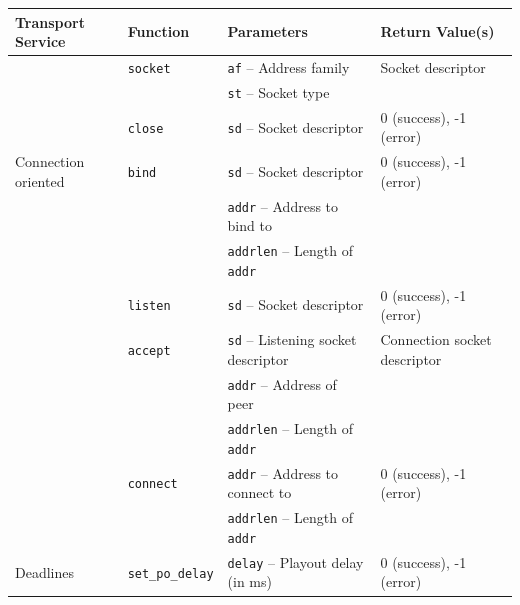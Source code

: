 \documentclass[10pt]{sig-alternate-05-2015}
\begin{document}
\begin{table}
  \small
  \centering
  \begin{tabularx}{\textwidth}{llll}
    \toprule
      Transport Service            & Function & Parameters                                     & Return Value(s) \\
    \midrule
                                   & \texttt{socket}
                                              & \texttt{af} -- Address family                  & Socket descriptor \\
                                   &          & \texttt{st} -- Socket type & \\
                                   & \texttt{close}
                                              & \texttt{sd} -- Socket descriptor               & 0 (success), -1 (error) \\
    \midrule
      Connection oriented          & \texttt{bind}
                                              & \texttt{sd} -- Socket descriptor               & 0 (success), -1 (error) \\
                                   &          & \texttt{addr} -- Address to bind to & \\
                                   &          & \texttt{addrlen} -- Length of \texttt{addr} & \\
                                   & \texttt{listen}
                                              & \texttt{sd} -- Socket descriptor               & 0 (success), -1 (error) \\
                                   & \texttt{accept}
                                              & \texttt{sd} -- Listening socket descriptor     & Connection socket descriptor \\
                                   &          & \texttt{addr} -- Address of peer & \\
                                   &          & \texttt{addrlen} -- Length of \texttt{addr} & \\
                                   & \texttt{connect}
                                              & \texttt{addr} -- Address to connect to         & 0 (success), -1 (error) \\
                                   &          & \texttt{addrlen} -- Length of \texttt{addr} & \\
    \midrule
      Deadlines                    & \texttt{set\_po\_delay}
                                              & \texttt{delay} -- Playout delay (in ms)        & 0 (success), -1 (error) \\

\end{tabularx}
\end{table}
\end{document}
